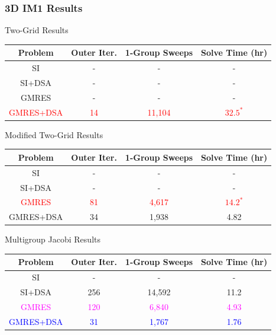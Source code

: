 \documentclass[compress,10pt]{beamer}
\newcommand{\tcr}[1]{\textcolor{red}{#1}}
\newcommand{\tcb}[1]{\textcolor{blue}{#1}}
\newcommand{\tcm}[1]{\textcolor{magenta}{#1}}
\begin{document}
\begin{frame}[t]\frametitle{3D IM1 Results}{\footnotesize
\vspace{-2mm}
\begin{block}{Two-Grid Results}
\begin{table}
\begin{tabular}{|c|c|c|c|}
\hline
Problem & Outer Iter.  & 1-Group Sweeps & Solve Time (hr)  \\
\hline \hline
SI & - & -  & -  \\ \hline
SI+DSA & -  & - & -  \\ \hline
GMRES & -  & - & - \\ \hline
\tcr{GMRES+DSA} & \tcr{14} &  \tcr{11,104}  &  \tcr{$32.5^*$}  \\ \hline
\end{tabular}
\end{table}
\end{block}
\vspace{-2mm}
\begin{block}{Modified Two-Grid Results}
\begin{table}
\begin{tabular}{|c|c|c|c|}
\hline
Problem & Outer Iter.  & 1-Group Sweeps & Solve Time (hr)  \\
\hline \hline
SI & - &  - & -  \\ \hline
SI+DSA & -  & - & -  \\ \hline
\tcr{GMRES} & \tcr{81}  & \tcr{4,617 }& \tcr{$14.2^*$} \\ \hline
GMRES+DSA & 34 &  1,938  &  4.82  \\ \hline
\end{tabular}
\end{table}
\end{block}
\vspace{-2mm}
\begin{block}{Multigroup Jacobi Results}
\begin{table}
\begin{tabular}{|c|c|c|c|}
\hline
Problem & Outer Iter. & 1-Group Sweeps & Solve Time (hr)  \\
\hline \hline
SI &  - & - & -  \\ \hline
SI+DSA & 256 &  14,592 & 11.2 \\ \hline
\tcm{GMRES} & \tcm{120} & \tcm{6,840} & \tcm{4.93} \\ \hline
\tcb{GMRES+DSA} & \tcb{31}& \tcb{1,767} & \tcb{1.76} \\ \hline
\end{tabular}
\end{table}
\end{block}
}
\end{frame}
\typeout{***********************************************************************************}
\end{document}

